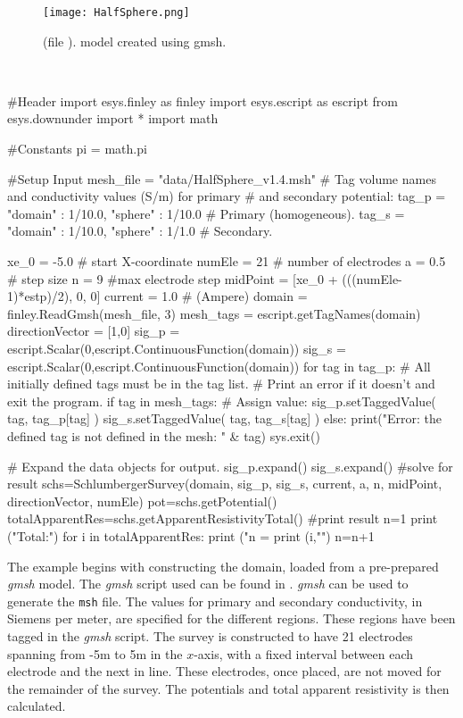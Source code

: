 \begin{figure}
\centering
\texttt{[image: HalfSphere.png]}
\caption{
    (file ). model created using gmsh.}
\label{fig:HalfSphere}
\end{figure}

\begin{pyc}\label{code: dc1}
\
\begin{python}
#Header
import esys.finley      as finley
import esys.escript     as escript
from esys.downunder     import *
import math

#Constants
pi = math.pi

#Setup Input
mesh_file = "data/HalfSphere_v1.4.msh"
# Tag volume names and conductivity values (S/m) for primary 
# and secondary potential:
tag_p = {"domain" : 1/10.0, "sphere" :  1/10.0} # Primary (homogeneous).
tag_s = {"domain" : 1/10.0, "sphere" :  1/1.0 } # Secondary.

xe_0 = -5.0 # start X-coordinate
numEle =  21  # number of electrodes
a =  0.5 # step size
n = 9 #max electrode step
midPoint = [xe_0 + (((numEle-1)*estp)/2), 0, 0]
current = 1.0 # (Ampere)
domain = finley.ReadGmsh(mesh_file, 3)
mesh_tags = escript.getTagNames(domain)
directionVector = [1,0]
sig_p = escript.Scalar(0,escript.ContinuousFunction(domain))
sig_s = escript.Scalar(0,escript.ContinuousFunction(domain))
for tag in tag_p:
    # All initially defined tags must be in the tag list.
    # Print an error if it doesn't and exit the program.
    if tag in mesh_tags:
        # Assign value:
        sig_p.setTaggedValue( tag, tag_p[tag] )
        sig_s.setTaggedValue( tag, tag_s[tag] )
    else:
        print("Error: the defined tag is not defined in the mesh: " & tag)
        sys.exit()

# Expand the data objects for output.
sig_p.expand()
sig_s.expand()
#solve for result
schs=SchlumbergerSurvey(domain, sig_p, sig_s, current, a, n, midPoint, 
    directionVector, numEle)
pot=schs.getPotential()
totalApparentRes=schs.getApparentResistivityTotal()
#print result
n=1
print ("Total:\n")
for i in totalApparentRes:
    print ("n = %
    print (i,"\n")
    n=n+1
\end{python}
\end{pyc}


The example begins with constructing the domain, loaded from a pre-prepared
\emph{gmsh} model. The \emph{gmsh} script used can be found in .
\emph{gmsh} can be used to generate the \texttt{msh} file. The values for primary and secondary 
conductivity, in Siemens per meter, are specified for the different regions. These regions have been tagged
in the \emph{gmsh} script. The survey is constructed to have 21 electrodes spanning from -5m to 5m
in the $x$-axis, with a fixed interval between each electrode and the next in 
line. These electrodes, once placed, are not moved for the remainder of the
survey. The potentials and total apparent resistivity is then calculated.

